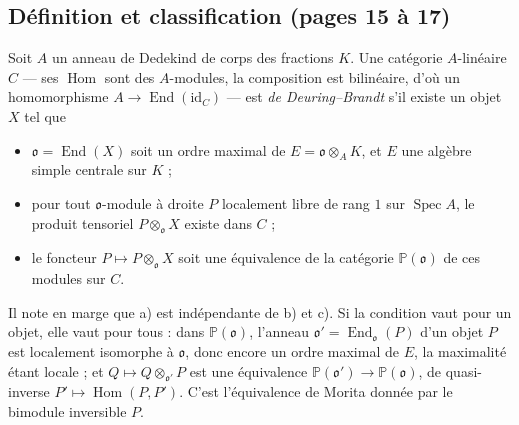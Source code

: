 \documentclass[11pt,a4paper]{article}
\begin{document}
\subsection*{Définition et classification (pages 15 à 17)}

Soit $A$ un anneau de Dedekind de corps des fractions $K$. Une catégorie
$A$-linéaire $C$ --- ses $\operatorname{Hom}$ sont des $A$-modules, la
composition est bilinéaire, d'où un homomorphisme $A \to
\operatorname{End}(\mathrm{id}_{C})$ --- est \emph{de Deuring--Brandt} s'il
existe un objet $X$ tel que
\begin{itemize}
  \item[a)] $\mathfrak{o} = \operatorname{End}(X)$ soit un ordre maximal de
  $E = \mathfrak{o} \otimes_{A} K$, et $E$ une algèbre simple centrale sur $K$ ;
  \item[b)] pour tout $\mathfrak{o}$-module à droite $P$ localement libre de rang
  $1$ sur $\operatorname{Spec} A$, le produit tensoriel $P \otimes_{\mathfrak{o}}
  X$ existe dans $C$ ;
  \item[c)] le foncteur $P \mapsto P \otimes_{\mathfrak{o}} X$ soit une
  équivalence de la catégorie $\mathbb{P}(\mathfrak{o})$ de ces modules sur
  $C$.
\end{itemize}
Il note en marge que a) est indépendante de b) et c). Si la condition vaut pour
un objet, elle vaut pour tous : dans $\mathbb{P}(\mathfrak{o})$, l'anneau
$\mathfrak{o}' = \operatorname{End}_{\mathfrak{o}}(P)$ d'un objet $P$ est
localement isomorphe à $\mathfrak{o}$, donc encore un ordre maximal de $E$, la
maximalité étant locale ; et $Q \mapsto Q \otimes_{\mathfrak{o}'} P$ est une
équivalence $\mathbb{P}(\mathfrak{o}') \to \mathbb{P}(\mathfrak{o})$, de
quasi-inverse $P' \mapsto \operatorname{Hom}(P, P')$. C'est l'équivalence de
Morita donnée par le bimodule inversible $P$.
\end{document}
